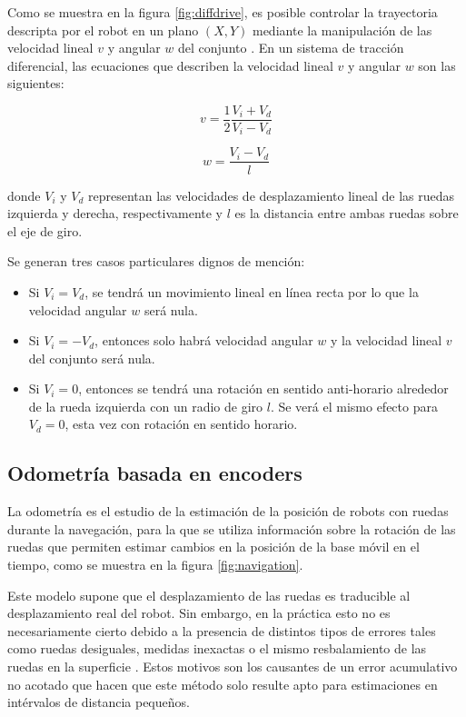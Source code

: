 Como se muestra en la figura \ref{fig:diffdrive}, es posible controlar la trayectoria descripta por el robot en un plano $(X,Y)$ mediante la manipulación de las velocidad lineal $v$ y angular $w$ del conjunto \citep{BOOK:3}. En un sistema de tracción diferencial, las ecuaciones que describen la velocidad lineal $v$ y angular $w$ son las siguientes:

\begin{equation}
    \label{eq:diffDriveLinear}
    v = \frac{1}{2} \frac{V_i + V_d}{V_i - V_d}
\end{equation}

\begin{equation}
    \label{eq:diffDriveAngular}
    w = \frac{V_i - V_d}{l}
\end{equation}

donde $V_i$ y $V_d$ representan las velocidades de desplazamiento lineal de las ruedas izquierda y derecha, respectivamente y $l$ es la distancia entre ambas ruedas sobre el eje de giro.

Se generan tres casos particulares dignos de mención:
\begin{itemize}
    \item Si $V_i = V_d$, se tendrá un movimiento lineal en línea recta por lo que la velocidad angular $w$ será nula.
    \item Si $V_i = - V_d$, entonces solo habrá velocidad angular $w$ y la velocidad lineal $v$ del conjunto será nula.
    \item Si $V_i = 0$, entonces se tendrá una rotación en sentido anti-horario alrededor de la rueda izquierda con un radio de giro $l$. Se verá el mismo efecto para $V_d = 0$, esta vez con rotación en sentido horario.
\end{itemize}

\subsection{Odometría basada en encoders}

La odometría es el estudio de la estimación de la posición de robots con ruedas durante la navegación, para la que se utiliza información sobre la rotación de las ruedas que permiten estimar cambios en la posición de la base móvil en el tiempo, como se muestra en la figura \ref{fig:navigation}.

Este modelo supone que el desplazamiento de las ruedas es traducible al desplazamiento real del robot. Sin embargo, en la práctica esto no es necesariamente cierto debido a la presencia de distintos tipos de errores tales como ruedas desiguales, medidas inexactas o el mismo resbalamiento de las ruedas en la superficie \citep{PAPER:2}. Estos motivos son los causantes de un error acumulativo no acotado que hacen que este método solo resulte apto para estimaciones en intérvalos de distancia pequeños.


